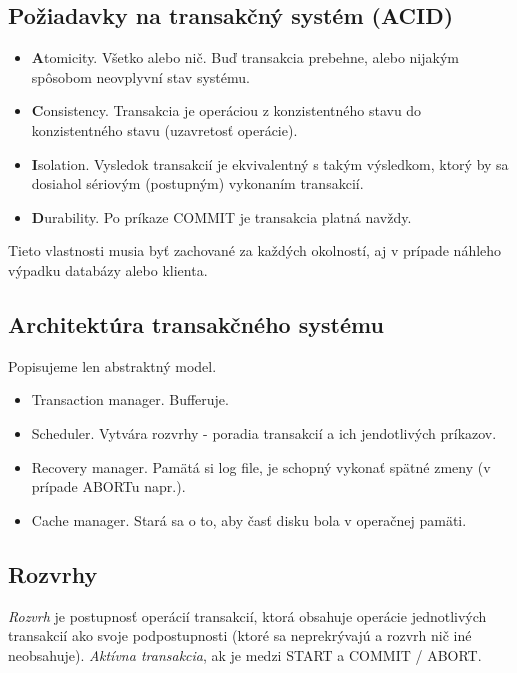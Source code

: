 \documentclass[10pt,a4paper]{article}
\begin{document}
\subsection{Požiadavky na transakčný systém (ACID)}

\begin{itemize}
\item {\bf A}tomicity. Všetko alebo nič. Buď transakcia prebehne, alebo nijakým spôsobom neovplyvní stav systému.
\item {\bf C}onsistency. Transakcia je operáciou z konzistentného stavu do konzistentného stavu (uzavretosť operácie).
\item {\bf I}solation. Vysledok transakcií je ekvivalentný s takým výsledkom, ktorý by sa dosiahol sériovým (postupným) vykonaním transakcií.
\item {\bf D}urability. Po príkaze COMMIT je transakcia platná navždy.
\end{itemize}

Tieto vlastnosti musia byť zachované za každých okolností, aj v prípade náhleho výpadku databázy alebo klienta.

\subsection{Architektúra transakčného systému}

Popisujeme len abstraktný model.

\begin{itemize}
\item Transaction manager. Bufferuje.
\item Scheduler. Vytvára rozvrhy - poradia transakcií a ich jendotlivých príkazov.
\item Recovery manager. Pamätá si log file, je schopný vykonať spätné zmeny (v prípade ABORTu napr.).
\item Cache manager. Stará sa o to, aby časť disku bola v operačnej pamäti.
\end{itemize}

\subsection{Rozvrhy}

\emph{Rozvrh} je postupnosť operácií transakcií, ktorá obsahuje operácie jednotlivých transakcií ako svoje podpostupnosti (ktoré sa neprekrývajú a rozvrh nič iné neobsahuje).
\emph{Aktívna transakcia}, ak je medzi START a COMMIT / ABORT.
\end{document}
